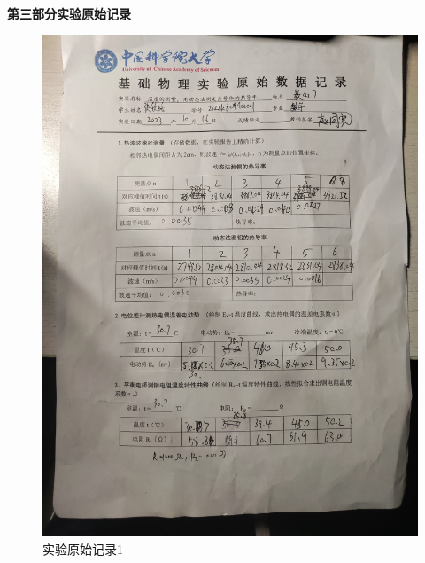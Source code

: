 \documentclass[11pt]{article}
\begin{document}
    \newpage
    \begin{center}
        \Large \bf 第三部分\qquad 实验原始记录
    \end{center}
    \begin{figure}[H]
        \centering
        \includegraphics[width=15cm]{Fig/4.jpg}
        \caption{实验原始记录1}
    \end{figure}
\end{document}

